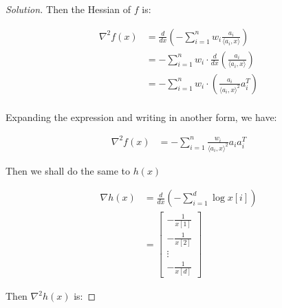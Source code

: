 \documentclass{article}
\newenvironment{solution}
  {\renewcommand\qedsymbol{$\blacksquare$}\begin{proof}[Solution]}
  {\end{proof}}
\begin{document}
\begin{solution}
Then the Hessian of $f$ is:

\begin{align*}
    \nabla^2 f(x) 
    &= \frac{d}{dx} \left( -\sum_{i=1}^n w_i \frac{a_i}{\langle a_i, x \rangle} \right) \\
    &= -\sum_{i=1}^n w_i \cdot \frac{d}{dx} \left( \frac{a_i}{\langle a_i, x \rangle} \right) \\
    &= -\sum_{i=1}^n w_i \cdot \left( \frac{a_i }{\langle a_i, x \rangle^2} a_i^T\right) \\
\end{align*}

Expanding the expression and writing in another form, we have:

\begin{align*}
    \nabla^2 f(x) 
    &= -\sum_{i=1}^n \frac{w_i}{\langle a_i, x \rangle^2} a_i a_i^T \tag{1}
\end{align*}

Then we shall do the same to $h(x)$

\begin{align*}
    \nabla h(x) 
    &= \frac{d}{dx} \left( -\sum_{i=1}^d \log x[i] \right) \\
    &= 
    \begin{bmatrix}
        -\frac{1}{x[1]} \\
        -\frac{1}{x[2]} \\
        \vdots \\
        -\frac{1}{x[d]}
    \end{bmatrix}
\end{align*}

Then $\nabla^2 h(x)$ is:


\end{solution}
\end{document}

